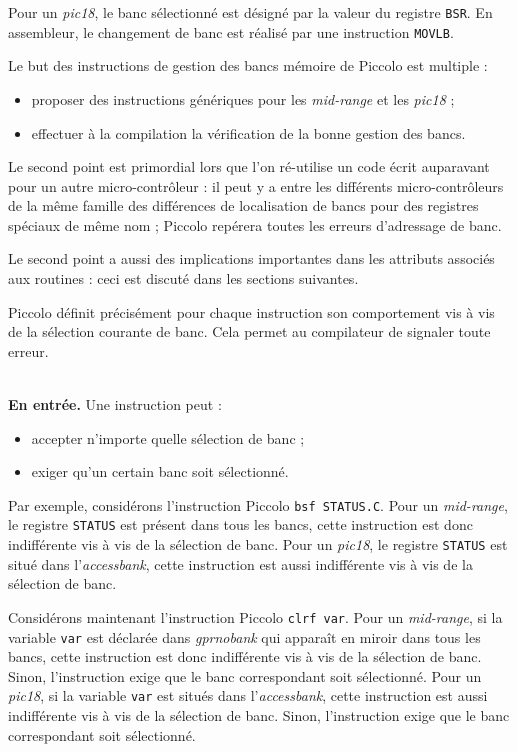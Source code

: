 Pour un \emph{pic18}, le banc sélectionné est désigné par la valeur du registre \texttt{BSR}. En assembleur, le changement de banc est réalisé par une instruction \texttt{MOVLB}.

Le but des instructions de gestion des bancs mémoire de Piccolo est multiple :
\begin{itemize}
  \item proposer des instructions génériques pour les \emph{mid-range} et les \emph{pic18} ;
  \item effectuer à la compilation la vérification de la bonne gestion des bancs.
\end{itemize}

Le second point est primordial lors que l'on ré-utilise un code écrit auparavant pour un autre micro-contrôleur : il peut y a entre les différents micro-contrôleurs de la même famille des différences de localisation de bancs pour des registres spéciaux de même nom ; Piccolo repérera toutes les erreurs d'adressage de banc.

Le second point a aussi des implications importantes dans les attributs associés aux routines : ceci est discuté dans les sections suivantes.









Piccolo définit précisément pour chaque instruction son comportement vis à vis de la sélection courante de banc. Cela permet au compilateur de signaler toute erreur.

~\\
\textbf{En entrée.} Une instruction peut :
\begin{itemize}
  \item accepter n'importe quelle sélection de banc ;
  \item exiger qu'un certain banc soit sélectionné.
\end{itemize}

Par exemple, considérons l'instruction Piccolo \texttt{bsf STATUS.C}. Pour un \emph{mid-range}, le registre \texttt{STATUS} est présent dans tous les bancs, cette instruction est donc indifférente vis à vis de la sélection de banc. Pour un \emph{pic18}, le registre \texttt{STATUS} est situé dans l'\emph{accessbank}, cette instruction est aussi indifférente vis à vis de la sélection de banc. 

Considérons maintenant l'instruction Piccolo \texttt{clrf var}. Pour un \emph{mid-range}, si la variable \texttt{var} est déclarée dans \emph{gprnobank} qui apparaît en miroir dans tous les bancs, cette instruction est donc indifférente vis à vis de la sélection de banc. Sinon, l'instruction exige que le banc correspondant soit sélectionné. Pour un \emph{pic18}, si la variable \texttt{var} est situés dans l'\emph{accessbank}, cette instruction est aussi indifférente vis à vis de la sélection de banc.  Sinon, l'instruction exige que le banc correspondant soit sélectionné. 


